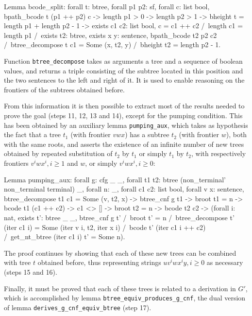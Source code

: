\documentclass {elsarticle}
\begin{document}
\begin{coq}
Lemma bcode_split:
forall t: btree,
forall p1 p2: sf,
forall c: list bool,
bpath_bcode t (p1 ++ p2) c ->
length p1 > 0 ->
length p2 > 1 ->
bheight t = length p1 + length p2 - 1 ->
exists c1 c2: list bool,
c = c1 ++ c2 /\
length c1 = length p1 /\
exists t2: btree,
exists x y: sentence,
bpath_bcode t2 p2 c2 /\
btree_decompose t c1 = Some (x, t2, y) /\
bheight t2 = length p2 - 1.
\end{coq}

Function \texttt {btree\_decompose} takes as arguments a tree and a sequence of boolean values, and returns a triple consisting of the subtree located in this position and the two sentences to the left and right of it. It is used to enable reasoning on the frontiers of the subtrees obtained before.

From this information it is then possible to extract most of the results needed to prove the goal (steps 11, 12, 13 and 14), except for the pumping condition. This has been obtained by an auxiliary lemma \texttt {pumping\_aux}, which takes as hypothesis the fact that a tree $t_1$ (with frontier $vwx$) has a subtree $t_2$ (with frontier $w$), both with the same roots, and asserts the existence of an infinite number of new trees obtained by repeated substitution of $t_2$ by $t_1$ or simply $t_1$ by $t_2$, with respectively frontiers $v^iwx^i, i \ge 1$ and $w$, or simply $v^iwx^i, i \ge 0$:

\begin{coq}
Lemma pumping_aux:
forall g: cfg _ _,
forall t1 t2: btree (non_terminal' non_terminal terminal) _,
forall n: _,
forall c1 c2: list bool,
forall v x: sentence,
btree_decompose t1 c1 = Some (v, t2, x) ->
btree_cnf g t1 ->
broot t1 = n ->
bcode t1 (c1 ++ c2) ->
c1 <> [] ->
broot t2 = n ->
bcode t2 c2 ->
(forall i: nat,
 exists t': btree _ _,
 btree_cnf g t' /\
 broot t' = n /\
 btree_decompose t' (iter c1 i) = Some (iter v i, t2, iter x i) /\
 bcode t' (iter c1 i ++ c2) /\
 get_nt_btree (iter c1 i) t' = Some n).
\end{coq}

The proof continues by showing that each of these new trees can be combined with tree $t$ obtained before, thus representing strings $uv^iwx^iy, i \ge 0$ as necessary (steps 15 and 16). 

Finally, it must be proved that each of these trees is related to a derivation in $G'$, which is accomplished by lemma \texttt {btree\_equiv\_produces\_g\_cnf}, the dual version of lemma \texttt {derives\_g\_cnf\_equiv\_btree} (step 17).
\end{document}
